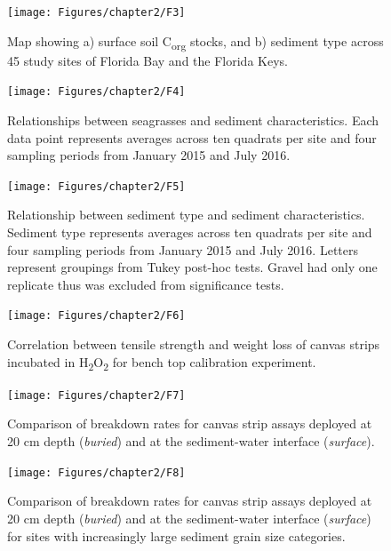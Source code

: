 \begin{figure}[t]
  \centering
  \texttt{[image: Figures/chapter2/F3]}
\caption[Map of sediment characteristics]{Map showing a) surface soil C\textsubscript{org} stocks, and b) sediment type across 45 study sites of Florida Bay and the Florida Keys.}
  \label{fig:2F3}
\end{figure}

\begin{figure}[t]
  \centering
  \texttt{[image: Figures/chapter2/F4]}
\caption[Relationships between seagrasses and sediment characteristics]{Relationships between seagrasses and sediment characteristics. Each data point represents averages across ten quadrats per site and four sampling periods from January 2015 and July 2016.}
  \label{fig:2F4}
\end{figure}

\begin{figure}[t]
  \centering
  \texttt{[image: Figures/chapter2/F5]}
\caption[Relationship between sediment type and sediment characteristics]{Relationship between sediment type and sediment characteristics. Sediment type represents averages across ten quadrats per site and four sampling periods from January 2015 and July 2016. Letters represent groupings from Tukey post-hoc tests. Gravel had only one replicate thus was excluded from significance tests.}
  \label{fig:2F5}
\end{figure}

\begin{figure}[t]
  \centering
  \texttt{[image: Figures/chapter2/F6]}
\caption[Correlation between canvas strip tensile strength and weight loss]{Correlation between tensile strength and weight loss of canvas strips incubated in H\textsubscript{2}O\textsubscript{2} for bench top calibration experiment.}
  \label{fig:2F6}
\end{figure}

\begin{figure}[t]
  \centering
  \texttt{[image: Figures/chapter2/F7]}
\caption[Breakdown rates for surface and buried canvas strips]{Comparison of breakdown rates for canvas strip assays deployed at 20 cm depth (\textit{buried}) and at the sediment-water interface (\textit{surface}).}
  \label{fig:2F7}
\end{figure}

\begin{figure}[t]
  \centering
  \texttt{[image: Figures/chapter2/F8]}
\caption[Breakdown rates for canvas strip assays across grain size categories.]{Comparison of breakdown rates for canvas strip assays deployed at 20 cm depth (\textit{buried}) and at the sediment-water interface (\textit{surface}) for sites with increasingly large sediment grain size categories.}
  \label{fig:2F8}
\end{figure}
